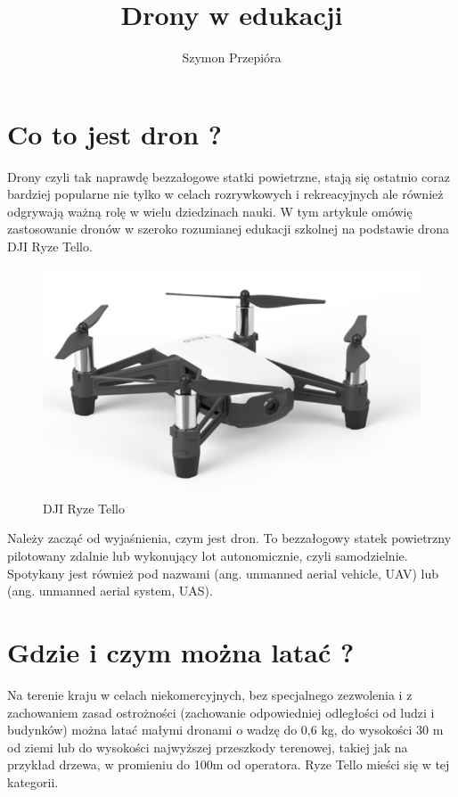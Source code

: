 \documentclass{article}
\title{Drony w edukacji}
\author{Szymon Przepióra}
\begin{document}
\maketitle
{}
\newpage
{}

\section{Co to jest dron ?}

Drony czyli tak naprawdę bezzałogowe statki powietrzne, stają się ostatnio coraz bardziej popularne nie tylko w celach rozrywkowych i rekreacyjnych ale również odgrywają ważną rolę w wielu dziedzinach nauki.
 W tym artykule omówię zastosowanie dronów w szeroko rozumianej edukacji szkolnej na podstawie drona DJI Ryze Tello.

\begin{figure}[h!]
  \includegraphics[width=\linewidth]{tello.jpg}
  \caption{DJI Ryze Tello}
  \label{fig:tello1}
\end{figure}

Należy zacząć od wyjaśnienia, czym jest dron. To bezzałogowy statek powietrzny pilotowany zdalnie lub wykonujący lot autonomicznie, czyli samodzielnie.
 Spotykany jest również pod nazwami (ang. unmanned aerial vehicle, UAV) lub (ang. unmanned aerial system, UAS).

\section{Gdzie i czym można latać ?}
Na terenie kraju w celach niekomercyjnych, bez specjalnego zezwolenia i z zachowaniem zasad ostrożności (zachowanie odpowiedniej odległości od ludzi i budynków) można latać małymi dronami o wadzę do 0,6 kg, do wysokości 30 m od ziemi lub do wysokości najwyższej przeszkody terenowej, takiej jak na przykład drzewa, w promieniu do 100m od operatora. Ryze Tello mieści się w tej kategorii.
\end{document}
